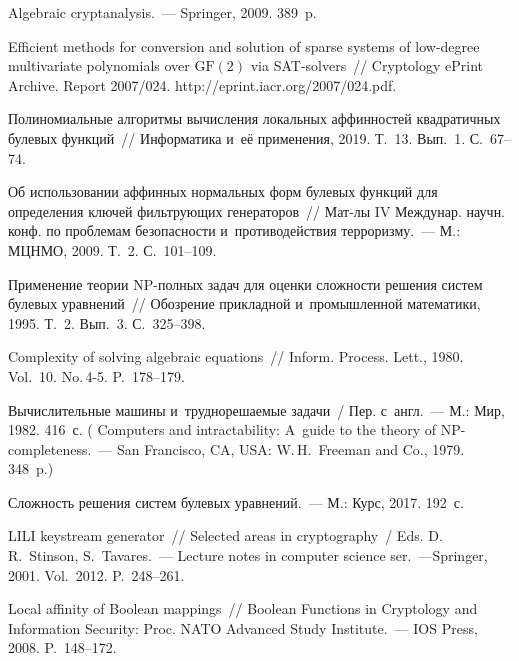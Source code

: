 \begin{multicols}{2}
{{\begin{thebibliography}{99}
        Algebraic cryptanalysis.~--- Springer, 2009. 389~p.

        {Efficient methods for conversion and solution of sparse systems of 
        low-degree multivariate polynomials over $\mathrm{GF}(2)$ via SAT-solvers}~//
        Cryptology ePrint Archive. Report 2007/024.
        {\sf http://eprint.iacr.org/2007/024.pdf}.

        {Полиномиальные алгоритмы вычисления локальных аффинностей квадратичных 
булевых функций}~//
        Информатика и~её применения, 2019. Т.~13. Вып.~1. С.~67--74.

        {Об использовании аффинных нормальных форм булевых функций для 
определения ключей фильтрующих генераторов}~//
        Мат-лы IV Междунар. научн. конф. по проблемам безопасности 
и~противодействия терроризму.~---
        М.: МЦНМО, 2009.  Т.~2. С.~101--109.

        {Применение теории NP-полных задач для оценки сложности решения систем 
булевых уравнений}~//
        Обозрение прикладной и~промышленной математики, 1995. Т.~2. Вып.~3. 
С.~325--398.

        {Complexity of solving algebraic equations}~//
        Inform. Process. Lett., 1980. Vol.~10. No.\,4-5. P.~178--179.

        Вычислительные машины и~труднорешаемые задачи~/ Пер. с~англ.~---
        М.: Мир, 1982. 416~с.
        ( Computers and intractability: 
A~guide to the theory of NP-completeness.~--- San Francisco, CA, USA: W.\,H.~Freeman 
and Co., 1979. 348~p.)

        Сложность решения сис\-тем булевых уравнений.~---
        М.: Курс, 2017. 192~с.

  

        LILI keystream generator~//
        Selected areas in cryptography~/ Eds. D.\,R.~Stinson, S.~Tavares.~---
        Lecture notes in computer science ser.~---Springer, 
        2001. Vol.~2012. P.~248--261.
        
        {Local affinity of Boolean mappings}~//
        Boolean Functions in Cryptology and Information Security: Proc.  
NATO Advanced Study Institute.~---
        IOS Press, 2008. P.~148--172.
        
 \end{thebibliography}

 }
 }

\end{multicols}

